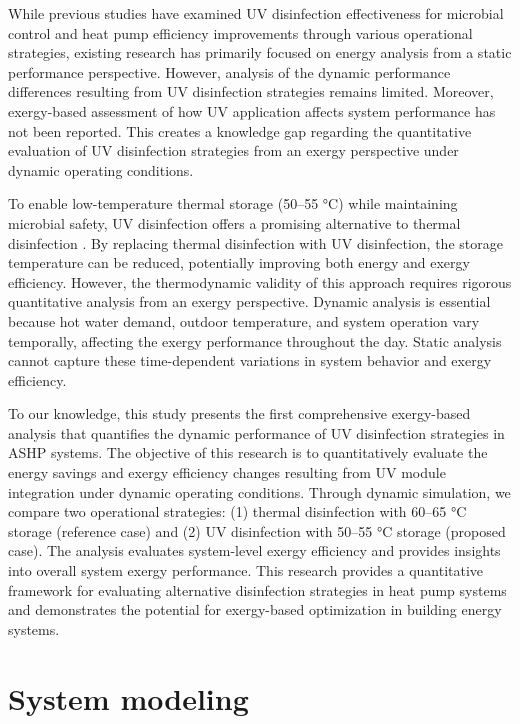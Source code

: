\documentclass[letterpaper,10pt]{article}
\begin{document}
While previous studies have examined UV disinfection effectiveness for microbial control \cite{epa2006uv} and heat pump efficiency improvements through various operational strategies, existing research has primarily focused on energy analysis from a static performance perspective. However, analysis of the dynamic performance differences resulting from UV disinfection strategies remains limited. Moreover, exergy-based assessment of how UV application affects system performance has not been reported. This creates a knowledge gap regarding the quantitative evaluation of UV disinfection strategies from an exergy perspective under dynamic operating conditions.

To enable low-temperature thermal storage (50--55 °C) while maintaining microbial safety, UV disinfection offers a promising alternative to thermal disinfection \cite{epa2006uv}. By replacing thermal disinfection with UV disinfection, the storage temperature can be reduced, potentially improving both energy and exergy efficiency. However, the thermodynamic validity of this approach requires rigorous quantitative analysis from an exergy perspective. Dynamic analysis is essential because hot water demand, outdoor temperature, and system operation vary temporally, affecting the exergy performance throughout the day. Static analysis cannot capture these time-dependent variations in system behavior and exergy efficiency.

To our knowledge, this study presents the first comprehensive exergy-based analysis that quantifies the dynamic performance of UV disinfection strategies in ASHP systems. The objective of this research is to quantitatively evaluate the energy savings and exergy efficiency changes resulting from UV module integration under dynamic operating conditions. Through dynamic simulation, we compare two operational strategies: (1) thermal disinfection with 60--65 °C storage (reference case) and (2) UV disinfection with 50--55 °C storage (proposed case). The analysis evaluates system-level exergy efficiency and provides insights into overall system exergy performance. This research provides a quantitative framework for evaluating alternative disinfection strategies in heat pump systems and demonstrates the potential for exergy-based optimization in building energy systems.

\section{System modeling}
\label{sec:system}
\end{document}
